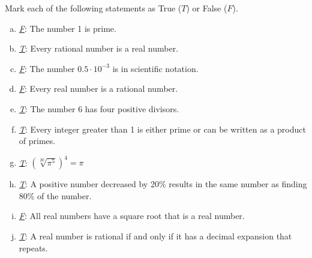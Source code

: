 \documentclass[12pt,letterpaper]{exam}
\begin{document}
\examtitle
{} 
\scores
\newpage

\begin{questions}

\newpage
\question[10] Mark each  of the following statements as True ($T$) or False ($F$). \pspace
\begin{enumerate}[(a)]
\item \underline{\itshape\hspace{0.65cm}F\hspace{0.65cm}}: The number 1 is prime. \vfill
\item \underline{\itshape\hspace{0.6cm}T\hspace{0.6cm}}: Every rational number is a real number. \vfill
\item \underline{\itshape\hspace{0.65cm}F\hspace{0.65cm}}: The number $0.5 \cdot 10^{-3}$ is in scientific notation. \vfill
\item \underline{\itshape\hspace{0.65cm}F\hspace{0.65cm}}: Every real number is a rational number. \vfill
\item \underline{\itshape\hspace{0.6cm}T\hspace{0.6cm}}: The number 6 has four positive divisors. \vfill
\item \underline{\itshape\hspace{0.6cm}T\hspace{0.6cm}}: Every integer greater than 1 is either prime or can be written as a product of primes. \vfill
\item \underline{\itshape\hspace{0.6cm}T\hspace{0.6cm}}: $\left( \sqrt[20]{\pi^5} \right)^4= \pi$ \vfill
\item \underline{\itshape\hspace{0.6cm}T\hspace{0.6cm}}: A positive number decreased by 20\% results in the same number as finding 80\% of the number. \vfill
\item \underline{\itshape\hspace{0.65cm}F\hspace{0.65cm}}: All real numbers have a square root that is a real number. \vfill
\item \underline{\itshape\hspace{0.6cm}T\hspace{0.6cm}}: A real number is rational if and only if it has a decimal expansion that repeats. \vfill
\end{enumerate}




\end{questions}
\end{document}
